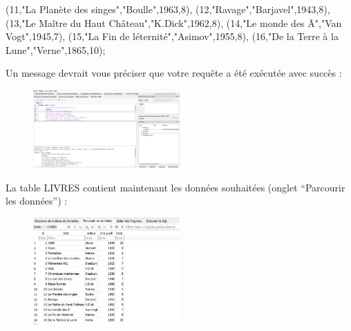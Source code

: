 \documentclass[
  letterpaper,
  DIV=11,
  numbers=noendperiod]{scrartcl}
\newenvironment{Shaded}{\begin{snugshade}}{\end{snugshade}}
\newcommand{\DecValTok}[1]{\textcolor[rgb]{0.68,0.00,0.00}{#1}}
\newcommand{\NormalTok}[1]{\textcolor[rgb]{0.00,0.23,0.31}{#1}}
\newcommand{\OtherTok}[1]{\textcolor[rgb]{0.00,0.23,0.31}{#1}}
\begin{document}
\begin{enumerate}
\begin{Shaded}
\begin{Highlighting}[]
\NormalTok{    (}\DecValTok{11}\NormalTok{,}\OtherTok{"La Planète des singes"}\NormalTok{,}\OtherTok{"Boulle"}\NormalTok{,}\DecValTok{1963}\NormalTok{,}\DecValTok{8}\NormalTok{),}
\NormalTok{    (}\DecValTok{12}\NormalTok{,}\OtherTok{"Ravage"}\NormalTok{,}\OtherTok{"Barjavel"}\NormalTok{,}\DecValTok{1943}\NormalTok{,}\DecValTok{8}\NormalTok{),}
\NormalTok{    (}\DecValTok{13}\NormalTok{,}\OtherTok{"Le Maître du Haut Château"}\NormalTok{,}\OtherTok{"K.Dick"}\NormalTok{,}\DecValTok{1962}\NormalTok{,}\DecValTok{8}\NormalTok{),}
\NormalTok{    (}\DecValTok{14}\NormalTok{,}\OtherTok{"Le monde des Ā"}\NormalTok{,}\OtherTok{"Van Vogt"}\NormalTok{,}\DecValTok{1945}\NormalTok{,}\DecValTok{7}\NormalTok{),}
\NormalTok{    (}\DecValTok{15}\NormalTok{,}\OtherTok{"La Fin de l\textquotesingle{}éternité"}\NormalTok{,}\OtherTok{"Asimov"}\NormalTok{,}\DecValTok{1955}\NormalTok{,}\DecValTok{8}\NormalTok{),}
\NormalTok{    (}\DecValTok{16}\NormalTok{,}\OtherTok{"De la Terre à la Lune"}\NormalTok{,}\OtherTok{"Verne"}\NormalTok{,}\DecValTok{1865}\NormalTok{,}\DecValTok{10}\NormalTok{);}
\end{Highlighting}
\end{Shaded}

  Un message devrait vous préciser que votre requête a été exécutée avec
  succès :

  \begin{figure}

  {\centering \includegraphics[width=0.5\textwidth,height=\textheight]{TP1_5.png}

  }

  \end{figure}

  La table LIVRES contient maintenant les données souhaitées (onglet
  ``Parcourir les données'') :

  \begin{figure}

  {\centering \includegraphics[width=0.5\textwidth,height=\textheight]{TP1_6.png}

}
\end{figure}
\end{enumerate}
\end{document}
